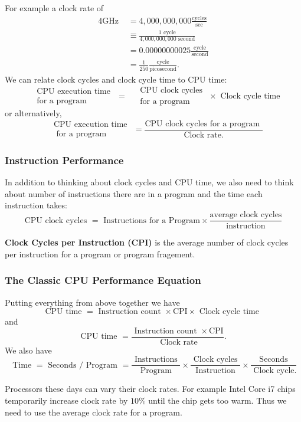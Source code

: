 \documentclass[10pt]{article}
\begin{document}
For example a clock rate of
\begin{align*}
  4\text{GHz } &= 4,000,000,000 \frac{\text{cycles}}{\text{sec}}\\
               &\equiv \frac{1 \text{ cycle}}{4,000,000,000 \text{ second}}\\
               &= 0.00000000025 \frac{\text{cycle}}{\text{second}}\\
               &= \frac{1}{250} \frac{\text{cycle}}{\text{picosecond}}.
\end{align*}
We can relate clock cycles and clock cycle time to CPU time:
$$
\begin{aligned}
& \text { CPU execution time } \\
& \text { for a program }
\end{aligned}=\begin{aligned}
& \text { CPU clock cycles } \\
& \text { for a program }
\end{aligned} \times \text { Clock cycle time }
$$
or alternatively,
$$
\begin{aligned}
& \mathrm{CPU} \text { execution time } \\
& \text { for a program }
\end{aligned}=\frac{\mathrm{CPU} \text { clock cycles for a program }}{\text { Clock rate. }}
$$
\subsubsection{Instruction Performance}
In addition to thinking about clock cycles and CPU time, we also need to think about number of instructions there are in a program and the time each instruction takes:
\[\text{CPU clock cycles } = \text{ Instructions for a Program} \times \frac{\text{average clock cycles}}{\text{instruction}}\]
\begin{marginfigure}
\textbf{Clock Cycles per Instruction (CPI)} is the average number of clock cycles per instruction for a program or program fragement.
\end{marginfigure}%
\subsubsection{The Classic CPU Performance Equation}
Putting everything from above together we have
\[
\mathrm{CPU} \text { time }=\text { Instruction count } \times \mathrm{CPI} \times \text { Clock cycle time }
\]
and
\[\mathrm{CPU} \text { time }=\frac{\text { Instruction count } \times \mathrm{CPI}}{\text { Clock rate}}.\]
We also have
\[\text { Time }=\text { Seconds } / \text { Program }=\frac{\text { Instructions }}{\text { Program }} \times \frac{\text { Clock cycles }}{\text { Instruction }} \times \frac{\text { Seconds }}{\text { Clock cycle.}}\]
\begin{marginfigure}
Processors these days can vary their clock rates.  For example Intel Core i7 chips temporarily increase clock rate by $10\%$ until the chip gets too warm.  Thus we need to use the average clock rate for a program.
  \caption{}
\end{marginfigure}%
\addtocounter{subsection}{3}
\end{document}

